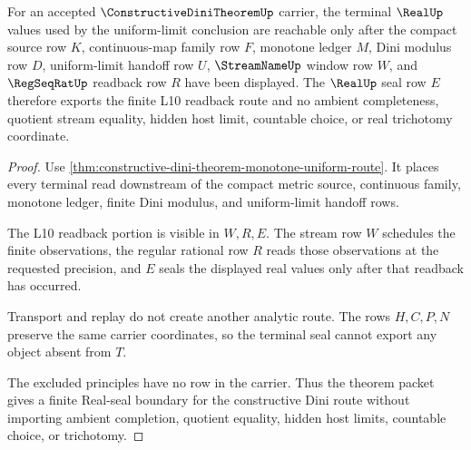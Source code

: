 \begin{theorem}
\label{thm:constructive-dini-theorem-l10-seal-nonescape}
For an accepted $\ConstructiveDiniTheoremUp$ carrier, the terminal $\RealUp$ values used by the uniform-limit conclusion are reachable only after the compact source row $K$, continuous-map family row $F$, monotone ledger $M$, Dini modulus row $D$, uniform-limit handoff row $U$, $\StreamNameUp$ window row $W$, and $\RegSeqRatUp$ readback row $R$ have been displayed. The $\RealUp$ seal row $E$ therefore exports the finite L10 readback route and no ambient completeness, quotient stream equality, hidden host limit, countable choice, or real trichotomy coordinate.
\end{theorem}
\begin{proof}
Use \autoref{thm:constructive-dini-theorem-monotone-uniform-route}. It places every terminal read downstream of the compact metric source, continuous family, monotone ledger, finite Dini modulus, and uniform-limit handoff rows.

The L10 readback portion is visible in $W,R,E$. The stream row $W$ schedules the finite observations, the regular rational row $R$ reads those observations at the requested precision, and $E$ seals the displayed real values only after that readback has occurred.

Transport and replay do not create another analytic route. The rows $H,C,P,N$ preserve the same carrier coordinates, so the terminal seal cannot export any object absent from $T$.

The excluded principles have no row in the carrier. Thus the theorem packet gives a finite Real-seal boundary for the constructive Dini route without importing ambient completion, quotient equality, hidden host limits, countable choice, or trichotomy.
\end{proof}

